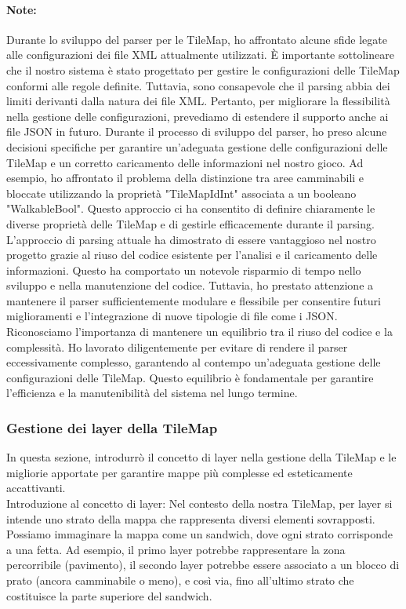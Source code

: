 \documentclass[a4paper,12pt]{report}
\begin{document}
\paragraph*{Note:}
Durante lo sviluppo del parser per le TileMap, ho affrontato alcune sfide legate alle configurazioni dei file XML attualmente utilizzati.
È importante sottolineare che il nostro sistema è stato progettato per gestire le configurazioni delle TileMap conformi alle regole definite. 
Tuttavia, sono consapevole che il parsing abbia dei limiti derivanti dalla natura dei file XML.
Pertanto, per migliorare la flessibilità nella gestione delle configurazioni, prevediamo di estendere il supporto anche ai file JSON in futuro.
Durante il processo di sviluppo del parser, ho preso alcune decisioni specifiche per garantire un'adeguata gestione delle configurazioni delle TileMap e un corretto caricamento delle informazioni nel nostro gioco. 
Ad esempio, ho affrontato il problema della distinzione tra aree camminabili e bloccate utilizzando la proprietà "TileMapIdInt" associata a un booleano "WalkableBool".
Questo approccio ci ha consentito di definire chiaramente le diverse proprietà delle TileMap e di gestirle efficacemente durante il parsing.
L'approccio di parsing attuale ha dimostrato di essere vantaggioso nel nostro progetto grazie al riuso del codice esistente per l'analisi e il caricamento delle informazioni.
Questo ha comportato un notevole risparmio di tempo nello sviluppo e nella manutenzione del codice. Tuttavia, ho prestato attenzione a mantenere il parser sufficientemente modulare e flessibile per consentire futuri miglioramenti e l'integrazione di nuove tipologie di file come i JSON.
Riconosciamo l'importanza di mantenere un equilibrio tra il riuso del codice e la complessità. 
Ho lavorato diligentemente per evitare di rendere il parser eccessivamente complesso, garantendo al contempo un'adeguata gestione delle configurazioni delle TileMap. 
Questo equilibrio è fondamentale per garantire l'efficienza e la manutenibilità del sistema nel lungo termine.
\\
\subsubsection*{Gestione dei layer della TileMap}
In questa sezione, introdurrò il concetto di layer nella gestione della TileMap e le migliorie apportate per garantire mappe più complesse ed esteticamente accattivanti.
\\
Introduzione al concetto di layer:
Nel contesto della nostra TileMap, per layer si intende uno strato della mappa che rappresenta diversi elementi sovrapposti. 
Possiamo immaginare la mappa come un sandwich, dove ogni strato corrisponde a una fetta. 
Ad esempio, il primo layer potrebbe rappresentare la zona percorribile (pavimento), il secondo layer potrebbe essere associato a un blocco di prato (ancora camminabile o meno), e così via, fino all'ultimo strato che costituisce la parte superiore del sandwich.
\end{document}

